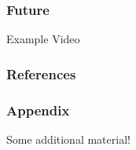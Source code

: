 \documentclass{beamer}
\begin{document}
\begin{frame}
\frametitle{Future}
Example Video
\begin{center}
\end{center}
\end{frame}

\begin{frame}
  \frametitle{References}


  
  
\end{frame}

\appendix

\begin{frame}
\frametitle{Appendix}
  Some additional material!
\end{frame}
\end{document}
